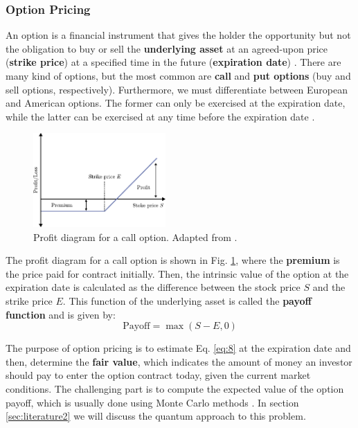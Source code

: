 \documentclass[prx,twocolumn,floatfix,superscriptaddress,longbibliography]{revtex4-1}
\begin{document}
\subsubsection{Option Pricing}
An option is a financial instrument that gives the holder the opportunity but not the obligation to buy or sell the  \textbf{underlying asset} at an agreed-upon price (\textbf{strike price}) at a specified time in the future (\textbf{expiration date}) \cite{Wilmott2007}. There are many kind of options, 
but the most common are \textbf{call} and \textbf{put options} (buy and sell options, respectively). Furthermore, we must 
differentiate between European and American options. The former can only be exercised at the expiration date, while the latter can be exercised at any time before the expiration date \cite{Rebentrost2018}. 
\begin{figure}
\centering
\includegraphics[width=0.45\textwidth]{pay-off.pdf}
  \caption{\label{fig:profit-diagram} Profit diagram for a call option. Adapted from \cite{Wilmott2007}.}
\end{figure}

The profit diagram for a call option is shown in Fig. \ref{fig:profit-diagram}, where the \textbf{premium} is the price paid for contract initially. Then, the 
intrinsic value of the option at the expiration date is calculated as the difference between the stock price $S$ and the strike price $E$. 
This function of the underlying asset is called the \textbf{payoff function} and is given by:
\begin{equation}
  \label{eq:8}
  \text{Payoff} = \max(S - E, 0)
\end{equation}

The purpose of option pricing is to estimate Eq. \ref{eq:8} at the expiration date and then, determine the \textbf{fair value}, which indicates the amount of money an 
investor should pay to enter the option contract today, given the current market conditions. 
The challenging part is to compute the expected value of the option payoff, which is usually done using Monte Carlo methods \cite{Sood2019}. In section \ref{sec:literature2} we will discuss the quantum approach to 
this problem.
\end{document}
